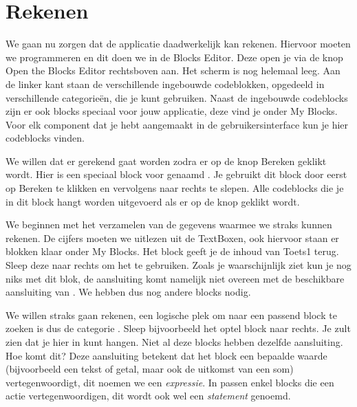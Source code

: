 \section{Rekenen}
We gaan nu zorgen dat de applicatie daadwerkelijk kan rekenen. Hiervoor moeten we programmeren en dit doen we in de Blocks Editor. Deze open je via de knop Open the Blocks Editor rechtsboven aan.  Het scherm is nog helemaal leeg. Aan de linker kant staan de verschillende ingebouwde codeblokken, opgedeeld in verschillende categorie\"en, die je kunt gebruiken. Naast de ingebouwde codeblocks zijn er ook blocks speciaal voor jouw applicatie, deze vind je onder My Blocks. Voor elk component dat je hebt aangemaakt in de gebruikersinterface kun je hier codeblocks vinden.

We willen dat er gerekend gaat worden zodra er op de knop Bereken geklikt wordt. Hier is een speciaal block voor genaamd . Je gebruikt dit block door eerst op Bereken te klikken en vervolgens  naar rechts te slepen. Alle codeblocks die je in dit block hangt worden uitgevoerd als er op de knop geklikt wordt.

We beginnen met het verzamelen van de gegevens waarmee we straks kunnen rekenen. De cijfers moeten we uitlezen uit de TextBoxen, ook hiervoor staan er blokken klaar onder My Blocks. Het block  geeft je de inhoud van Toets1 terug. Sleep deze naar rechts om het te gebruiken. Zoals je waarschijnlijk ziet kun je nog niks met dit blok, de aansluiting komt namelijk niet overeen met de beschikbare aansluiting van . We hebben dus nog andere blocks nodig.

We willen straks gaan rekenen, een logische plek om naar een passend block te zoeken is dus de categorie . Sleep bijvoorbeeld het optel block naar rechts. Je zult zien dat je hier  in kunt hangen. Niet al deze blocks hebben dezelfde aansluiting. Hoe komt dit? Deze aansluiting betekent dat het block een bepaalde waarde (bijvoorbeeld een tekst of getal, maar ook de uitkomst van een som) vertegenwoordigt, dit noemen we een \emph{expressie}. In  passen enkel blocks die een actie vertegenwoordigen, dit wordt ook wel een \emph{statement} genoemd. 

